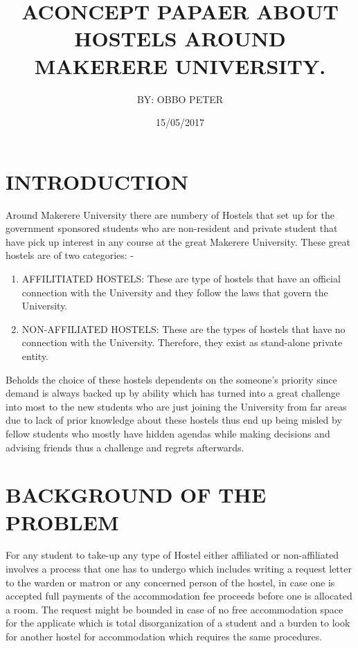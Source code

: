\documentclass{article}
\begin{document}
\title{ ACONCEPT PAPAER ABOUT  HOSTELS AROUND MAKERERE UNIVERSITY.}

\author{ BY: OBBO PETER}
\date {15/05/2017}


\maketitle


\tableofcontents


\section{INTRODUCTION}\label{sec:into}
Around Makerere University there are numbery of Hostels that set up for the government sponsored students who are non-resident and private student that have pick up interest in any course at the great Makerere University.
	These great hostels are of two categories: -
	\begin{enumerate}
	\item  AFFILITIATED HOSTELS: These are type of hostels that have an official connection with the University and they follow the laws that govern the University.
	\item NON-AFFILIATED HOSTELS: These are the types of hostels that have no connection with the University. Therefore, they exist as stand-alone private entity.
\end{enumerate}

Beholds the choice of these hostels dependents on the someone’s priority since demand is always backed up by ability which has turned into a great challenge into most to the new students who are just joining the University from far areas due to lack of prior knowledge about these hostels thus end up being misled by fellow students who mostly have hidden agendas while making decisions and advising friends thus a challenge and regrets afterwards. 

	

\section{BACKGROUND OF THE PROBLEM}\label{sec:into}

For any student to take-up any type of Hostel either affiliated or non-affiliated involves a process that one has to undergo which includes writing a request letter to the warden or matron or any concerned person of the hostel, in case one is accepted full payments of the accommodation fee proceeds before one is allocated a room.
The request might be bounded in case of no free accommodation space for the applicate which is total disorganization of a student and a burden to look for another hostel for accommodation which requires the same procedures.   
\end{document}
